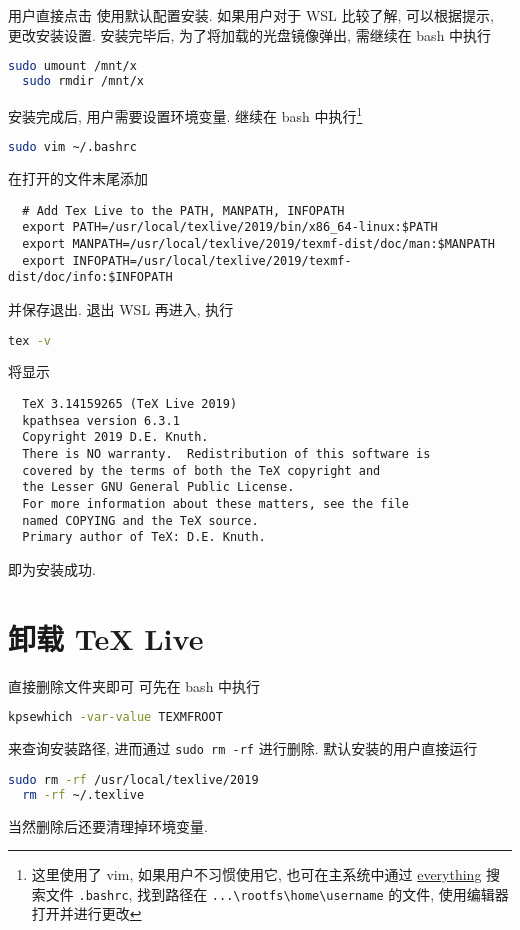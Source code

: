 用户直接点击  使用默认配置安装.
如果用户对于 WSL 比较了解, 可以根据提示, 更改安装设置.
安装完毕后,
为了将加载的光盘镜像弹出,
需继续在 \textsf{bash} 中执行
\begin{lstlisting}[language = bash]
  sudo umount /mnt/x
  sudo rmdir /mnt/x
\end{lstlisting}

安装完成后, 用户需要设置环境变量.
继续在 \textsf{bash} 中执行\footnote{这里使用了 vim, 如果用户不习惯使用它, 也可在主系统中通过 \href{https://www.voidtools.com/zh-cn/}{everything} 搜索文件 \texttt{.bashrc}, 找到路径在 \texttt{...\textbackslash rootfs\textbackslash home\textbackslash username} 的文件, 使用编辑器打开并进行更改}
\begin{lstlisting}[language = bash]
  sudo vim ~/.bashrc
\end{lstlisting}
在打开的文件末尾添加
\begin{lstlisting}
  # Add Tex Live to the PATH, MANPATH, INFOPATH
  export PATH=/usr/local/texlive/2019/bin/x86_64-linux:$PATH
  export MANPATH=/usr/local/texlive/2019/texmf-dist/doc/man:$MANPATH
  export INFOPATH=/usr/local/texlive/2019/texmf-dist/doc/info:$INFOPATH
\end{lstlisting}
并保存退出.
退出 WSL 再进入, 执行
\begin{lstlisting}[language=bash]
  tex -v
\end{lstlisting}
将显示
\begin{lstlisting}
  TeX 3.14159265 (TeX Live 2019)
  kpathsea version 6.3.1
  Copyright 2019 D.E. Knuth.
  There is NO warranty.  Redistribution of this software is
  covered by the terms of both the TeX copyright and
  the Lesser GNU General Public License.
  For more information about these matters, see the file
  named COPYING and the TeX source.
  Primary author of TeX: D.E. Knuth.
\end{lstlisting}
即为安装成功.

\section{卸载 \TeX{} Live}

直接删除文件夹即可
可先在 \textsf{bash} 中执行
\begin{lstlisting}[language = bash]
  kpsewhich -var-value TEXMFROOT
\end{lstlisting}
来查询安装路径,
进而通过 \texttt{sudo rm -rf} 进行删除.
默认安装的用户直接运行
\begin{lstlisting}[language = bash]
  sudo rm -rf /usr/local/texlive/2019
  rm -rf ~/.texlive
\end{lstlisting}
当然删除后还要清理掉环境变量.

